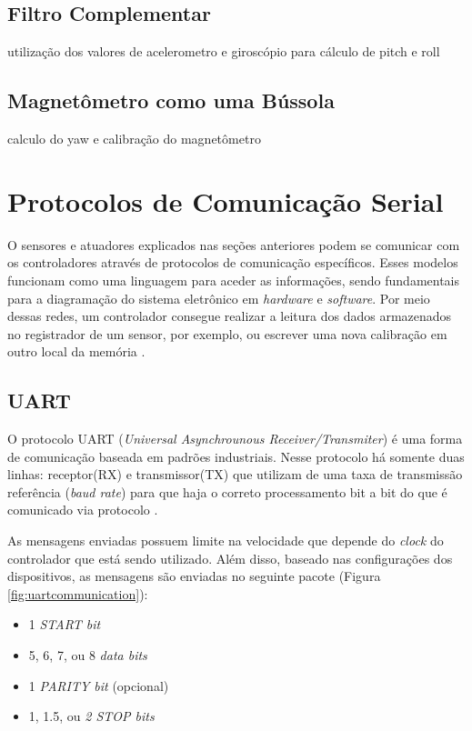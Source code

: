 \subsection{Filtro Complementar}
utilização dos valores de acelerometro e giroscópio para cálculo de pitch e roll

\cite{tcc:viniciusPID2Graus}

\subsection{Magnetômetro como uma Bússola}
calculo do yaw e calibração do magnetômetro

\section{Protocolos de Comunicação Serial}

O sensores e atuadores explicados nas seções anteriores podem se comunicar com os controladores através de protocolos de comunicação específicos. Esses modelos funcionam como uma linguagem para aceder as informações, sendo fundamentais para a diagramação do sistema eletrônico em \textit{hardware} e \textit{software}. Por meio dessas redes, um controlador consegue realizar a leitura dos dados armazenados no registrador de um sensor, por exemplo, ou escrever uma nova calibração em outro local da memória \cite{man:texasI2C}.

\subsection{UART}
O protocolo UART (\textit{Universal Asynchrounous Receiver/Transmiter}) é uma forma de comunicação baseada em padrões industriais. Nesse protocolo há somente duas linhas: receptor(RX) e transmissor(TX) que utilizam de uma taxa de transmissão referência (\textit{baud rate}) para que haja o correto processamento bit a bit do que é comunicado via protocolo \cite{man:texasUART}. 

As mensagens enviadas possuem limite na velocidade que depende do \textit{clock} do controlador que está sendo utilizado. Além disso, baseado nas configurações dos dispositivos, as mensagens são enviadas no seguinte pacote (Figura \ref{fig:uartcommunication}):

\begin{itemize}
	\item 1 \textit{START bit}
	\item 5, 6, 7, ou  8 \textit{data bits}
	\item 1 \textit{PARITY bit} (opcional)
	\item 1, 1.5, ou \textit{2 STOP bits}
\end{itemize}

